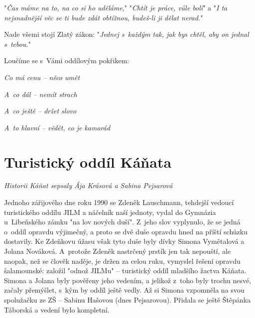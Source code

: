 \documentclass[a5paper, 11pt, twoside]{article}
\begin{document}
"\textit{Čas máme na to, na co si ho uděláme}," "\textit{Chtít je práce, vůle bolí}" a "\textit{I ta nejsnadnější věc se ti bude zdát obtížnou, budeš-li ji dělat nerad.}"

Nade všemi stojí Zlatý zákon: "\textit{Jednej s~každým tak, jak bys chtěl, aby on jednal s~tebou.}"

\vspace*{6pt}
Loučíme se s~Vámi oddílovým pokřikem:

\textit{Co má cenu -- něco umět}

\textit{A~co dál -- nemít strach}

\textit{A~co ještě -- držet slovo}

\textit{A~to hlavní -- vědět, co je kamarád}

\section{Turistický oddíl Káňata}

\begin{center}
  \textit{Historii Káňat sepsaly Ája Krásová a Sabina Pejsarová}
\end{center}

\noindent
Jednoho zářijového dne roku 1990 se Zdeněk Lauschmann, tehdejší vedoucí
turistického oddílu JILM a náčelník naší jednoty, vydal do Gymnázia
u~Libeňského zámku "na lov nových duší". Z~jeho slov vyplynulo, že se
jedná o~oddíl opravdu výjimečný, a proto se dvě duše opravdu hned na
příští schůzku dostavily. Ke Zdeňkovu úžasu však tyto duše byly dívky
Simona Vymětalová a Jolana Nováková. A~protože Zdeněk nastrčený prstík
jen tak nepouští, ale naopak, než se člověk naděje, je držen za celou
ruku, vymyslel řešení opravdu šalamounské: založil "odnož JILMu" --
turistický oddíl mladšího žactva Káňata. Simona a Jolana byly pověřeny
jeho vedením, a jelikož z~toho byly trochu nesvé, začaly přemýšlet,
s~kým by oddíl ještě vedly. Až si Simona vzpomněla na svou spolužačku ze
ZŠ -- Sabinu Hašovou (dnes Pejsarovou). Přidala se ještě Štěpánka
Táborská a vedení bylo kompletní.
\end{document}
